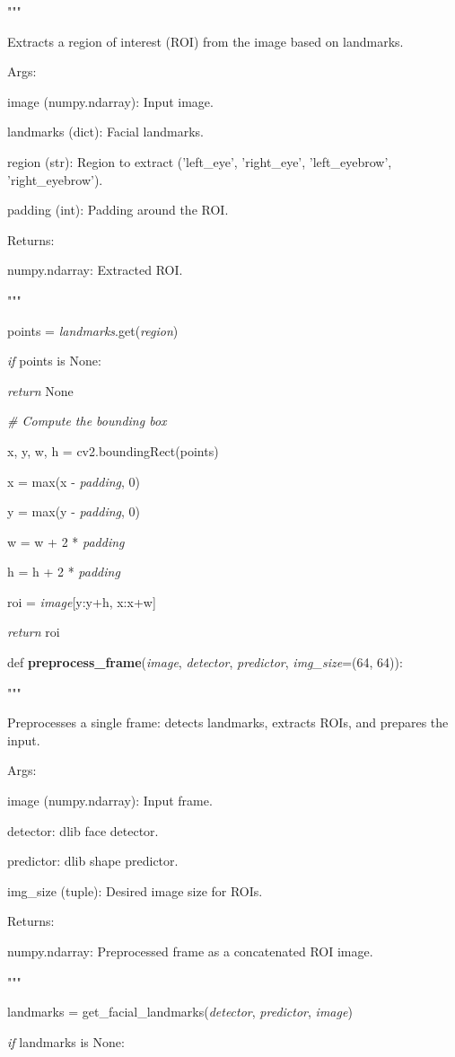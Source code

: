 \documentclass[
]{article}
\begin{document}
"""

Extracts a region of interest (ROI) from the image based on landmarks.

Args:

image (numpy.ndarray): Input image.

landmarks (dict): Facial landmarks.

region (str): Region to extract ('left\_eye', 'right\_eye', 'left\_eyebrow', 'right\_eyebrow').

padding (int): Padding around the ROI.

Returns:

numpy.ndarray: Extracted ROI.

"""

points = \emph{landmarks}.get(\emph{region})

\emph{if} points is None:

\emph{return} None

\emph{\# Compute the bounding box}

x, y, w, h = cv2.boundingRect(points)

x = max(x - \emph{padding}, 0)

y = max(y - \emph{padding}, 0)

w = w + 2 * \emph{padding}

h = h + 2 * \emph{padding}

roi = \emph{image}{[}y:y+h, x:x+w{]}

\emph{return} roi

def \textbf{preprocess\_frame}(\emph{image}, \emph{detector}, \emph{predictor}, \emph{img\_size}=(64, 64)):

"""

Preprocesses a single frame: detects landmarks, extracts ROIs, and prepares the input.

Args:

image (numpy.ndarray): Input frame.

detector: dlib face detector.

predictor: dlib shape predictor.

img\_size (tuple): Desired image size for ROIs.

Returns:

numpy.ndarray: Preprocessed frame as a concatenated ROI image.

"""

landmarks = get\_facial\_landmarks(\emph{detector}, \emph{predictor}, \emph{image})

\emph{if} landmarks is None:
\end{document}
